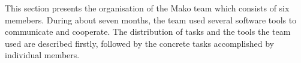 This section presents the organisation of the Mako team which consists of six memebers. During about seven months, the team used several software tools to communicate and cooperate. The distribution of tasks and the tools the team used are described firstly, followed by the concrete tasks accomplished by individual members. 









